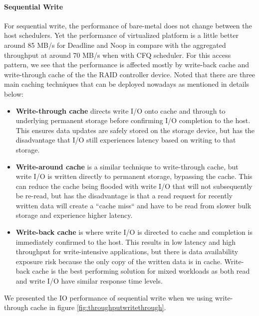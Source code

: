 \documentclass{acmsig}
\begin{document}
\paragraph{Sequential Write}
For sequential write, the performance of bare-metal does not change between the host schedulers. Yet the performance of virtualized platform is a little better around 85 MB/s for Deadline and Noop in compare with the aggregated throughput at around 70 MB/s when with CFQ scheduler.
For this access pattern, we see that the performance is affected mostly by write-back cache and write-through cache of the the RAID controller device. Noted that there are three main caching techniques that can be deployed nowadays as mentioned in details below:
\begin{itemize}
  \item \textbf{Write-through cache} directs write I/O onto cache and through to underlying permanent storage before confirming I/O completion to the host. This ensures data updates are safely stored on the storage device, but has the disadvantage that I/O still experiences latency based on writing to that storage.
  \item \textbf{Write-around cache} is a similar technique to write-through cache, but write I/O is written directly to permanent storage, bypassing the cache. This can reduce the cache being flooded with write I/O that will not subsequently be re-read, but has the disadvantage is that a read request for recently written data will create a ``cache miss`` and have to be read from slower bulk storage and experience higher latency.
  \item \textbf{Write-back cache} is where write I/O is directed to cache and completion is immediately confirmed to the host. This results in low latency and high throughput for write-intensive applications, but there is data availability exposure risk because the only copy of the written data is in cache. Write-back cache is the best performing solution for mixed workloads as both read and write I/O have similar response time levels.
\end{itemize}

We presented the IO performance of sequential write when we using write-through cache in figure \ref{fig:throughputwritethrough}.
\end{document}
